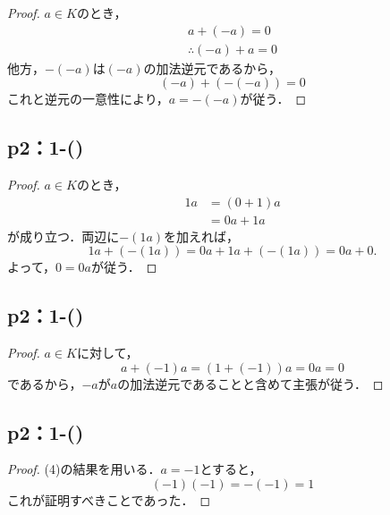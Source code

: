 \begin{leftbar}
    \begin{proof}
        $a \in K$のとき，
        \begin{gather*}
            a+(-a)=0 \\
            \therefore (-a)+a =0
        \end{gather*}
        他方，$-(-a)$は$(-a)$の加法逆元であるから，
        \[
            (-a)+(-(-a))=0
        \]
        これと逆元の一意性により，$a=-(-a)$が従う．
    \end{proof}
\end{leftbar}

\subsection*{p2：1-()}
\begin{leftbar}
    \begin{proof}
        $a \in K$のとき，
        \begin{align*}
            1a & = (0 + 1)a \\
               & = 0a + 1a
        \end{align*}
        が成り立つ．両辺に$-(1a)$を加えれば，
        \[
            1a + (-(1a)) = 0a + 1a + (-(1a)) = 0a + 0.
        \]
        よって，$0 = 0a$が従う．
    \end{proof}
\end{leftbar}

\subsection*{p2：1-()}
\begin{leftbar}
    \begin{proof}
        $a \in K$に対して，
        \[
            a+(-1)a=(1+(-1))a =0a =0
        \]
        であるから，$-a$が$a$の加法逆元であることと含めて主張が従う．
    \end{proof}
\end{leftbar}

\newpage

\subsection*{p2：1-()}
\begin{leftbar}
    \begin{proof}
        (4)の結果を用いる．$a=-1$とすると，
        \[
            (-1)(-1)=-(-1)=1
        \]
        これが証明すべきことであった．
    \end{proof}
\end{leftbar}
